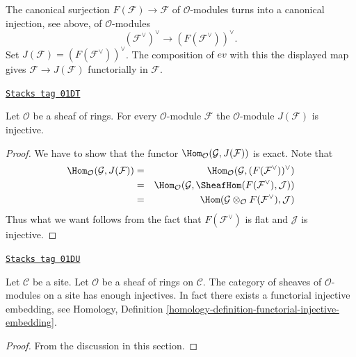 The canonical surjection
$F(\mathcal{F}) \to \mathcal{F}$ of $\mathcal{O}$-modules turns into a
canonical injection, see above, of $\mathcal{O}$-modules
$$
(\mathcal{F}^\vee)^\vee \longrightarrow (F(\mathcal{F}^\vee))^\vee.
$$
Set $J(\mathcal{F}) = (F(\mathcal{F}^\vee))^\vee$.
The composition of $ev$ with this
the displayed map gives
$\mathcal{F} \to J(\mathcal{F})$ functorially in $\mathcal{F}$.

\begin{lemma}
\label{injectives-lemma-JM-injective-sheaves}
\href{https://stacks.math.columbia.edu/tag/01DT}{\texttt{Stacks tag 01DT}}

Let $\mathcal{O}$ be a sheaf of rings.
For every $\mathcal{O}$-module $\mathcal{F}$ the
$\mathcal{O}$-module $J(\mathcal{F})$ is injective.
\end{lemma}

\begin{proof}
We have to show that the functor
$\Hom_\mathcal{O}(\mathcal{G}, J(\mathcal{F}))$
is exact. Note that
\begin{eqnarray*}
\Hom_\mathcal{O}(\mathcal{G}, J(\mathcal{F}))
& = &
\Hom_\mathcal{O}(\mathcal{G}, (F(\mathcal{F}^\vee))^\vee) \\
& = &
\Hom_\mathcal{O}
(\mathcal{G}, \SheafHom(F(\mathcal{F}^\vee), \mathcal{J})) \\
& = &
\Hom(\mathcal{G} \otimes_\mathcal{O} F(\mathcal{F}^\vee), \mathcal{J})
\end{eqnarray*}
Thus what we want follows from the fact that $F(\mathcal{F}^\vee)$
is flat and $\mathcal{J}$ is injective.
\end{proof}

\begin{theorem}
\label{injectives-theorem-sheaves-modules-injectives}
\href{https://stacks.math.columbia.edu/tag/01DU}{\texttt{Stacks tag 01DU}}

Let $\mathcal{C}$ be a site.
Let $\mathcal{O}$ be a sheaf of rings on $\mathcal{C}$.
The category of sheaves of $\mathcal{O}$-modules on a
site has enough injectives. In fact there exists
a functorial injective embedding, see
Homology, Definition \ref{homology-definition-functorial-injective-embedding}.
\end{theorem}

\begin{proof}
From the discussion in this section.
\end{proof}

